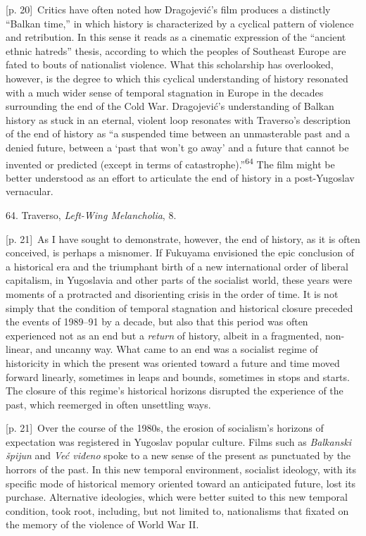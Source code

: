 \documentclass[10pt,a4paper]{article}
\begin{document}
{\scriptsize\color{gray} [p. 20]}\ Critics have often noted how Dragojević’s film produces a distinctly “Balkan time,” in which history is characterized by a cyclical pattern of violence and retribution. In this sense it reads as a cinematic expression of the “ancient ethnic hatreds” thesis, according to which the peoples of Southeast Europe are fated to bouts of nationalist violence. What this scholarship has overlooked, however, is the degree to which this cyclical understanding of history resonated with a much wider sense of temporal stagnation in Europe in the decades surrounding the end of the Cold War. Dragojević’s understanding of Balkan history as stuck in an eternal, violent loop resonates with Traverso’s description of the end of history as “a suspended time between an unmasterable past and a denied future, between a ‘past that won’t go away’ and a future that cannot be invented or predicted (except in terms of catastrophe).”\nobreak\textsuperscript{64} The film might be better understood as an effort to articulate the end of history in a post-Yugoslav vernacular.\par{\small 64. Traverso, \textit{Left-Wing Melancholia}, 8.\par}
{\scriptsize\color{gray} [p. 21]}\ As I have sought to demonstrate, however, the end of history, as it is often conceived, is perhaps a misnomer. If Fukuyama envisioned the epic conclusion of a historical era and the triumphant birth of a new international order of liberal capitalism, in Yugoslavia and other parts of the socialist world, these years were moments of a protracted and disorienting crisis in the order of time. It is not simply that the condition of temporal stagnation and historical closure preceded the events of 1989–91 by a decade, but also that this period was often experienced not as an end but a \textit{return} of history, albeit in a fragmented, non-linear, and uncanny way. What came to an end was a socialist regime of historicity in which the present was oriented toward a future and time moved forward linearly, sometimes in leaps and bounds, sometimes in stops and starts. The closure of this regime’s historical horizons disrupted the experience of the past, which reemerged in often unsettling ways.\par
{\scriptsize\color{gray} [p. 21]}\ Over the course of the 1980s, the erosion of socialism’s horizons of expectation was registered in Yugoslav popular culture. Films such as \textit{Balkanski špijun} and \textit{Već viđeno} spoke to a new sense of the present as punctuated by the horrors of the past. In this new temporal environment, socialist ideology, with its specific mode of historical memory oriented toward an anticipated future, lost its purchase. Alternative ideologies, which were better suited to this new temporal condition, took root, including, but not limited to, nationalisms that fixated on the memory of the violence of World War II.\par
\end{document}
